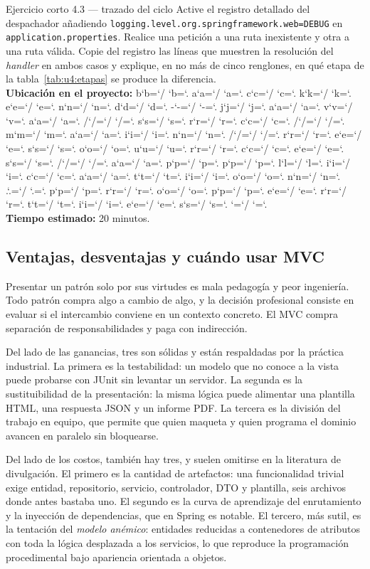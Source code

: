 \documentclass[11pt,a4paper,openany]{book}
\newcommand{\ruta}[1]{{\ttfamily\small\rutaaux #1\relax}}
\def\rutaaux{\futurelet\next\rutapaso}
\def\rutapaso{%
	\ifx\next\relax \let\sig\relax
	\else \let\sig\rutaimprime \fi \sig}
\def\rutaimprime#1{%
	#1\ifnum`#1=`/ \allowbreak\fi
	\ifnum`#1=`. \allowbreak\fi
	\rutaaux}
\begin{document}
\begin{cajaejercicio}{Ejercicio corto 4.3 --- trazado del ciclo}
	Active el registro detallado del despachador añadiendo \texttt{logging.level.org.springframework.web=DEBUG} en \texttt{application.properties}. Realice una petición a una ruta inexistente y otra a una ruta válida. Copie del registro las líneas que muestren la resolución del \emph{handler} en ambos casos y explique, en no más de cinco renglones, en qué etapa de la tabla~\ref{tab:u4:etapas} se produce la diferencia.\\[3pt]
	\textbf{Ubicación en el proyecto:} \ruta{backend-java/src/main/resources/application.properties}\\[3pt]
	\textbf{Tiempo estimado:} 20 minutos.
\end{cajaejercicio}

\subsection{Ventajas, desventajas y cuándo usar MVC}
\label{sec:u4:ventajas}

Presentar un patrón solo por sus virtudes es mala pedagogía y peor ingeniería. Todo patrón compra algo a cambio de algo, y la decisión profesional consiste en evaluar si el intercambio conviene en un contexto concreto. El MVC compra separación de responsabilidades y paga con indirección.

Del lado de las ganancias, tres son sólidas y están respaldadas por la práctica industrial. La primera es la testabilidad: un modelo que no conoce a la vista puede probarse con JUnit sin levantar un servidor. La segunda es la sustituibilidad de la presentación: la misma lógica puede alimentar una plantilla HTML, una respuesta JSON y un informe PDF. La tercera es la división del trabajo en equipo, que permite que quien maqueta y quien programa el dominio avancen en paralelo sin bloquearse.

Del lado de los costos, también hay tres, y suelen omitirse en la literatura de divulgación. El primero es la cantidad de artefactos: una funcionalidad trivial exige entidad, repositorio, servicio, controlador, DTO y plantilla, seis archivos donde antes bastaba uno. El segundo es la curva de aprendizaje del enrutamiento y la inyección de dependencias, que en Spring es notable. El tercero, más sutil, es la tentación del \emph{modelo anémico}: entidades reducidas a contenedores de atributos con toda la lógica desplazada a los servicios, lo que reproduce la programación procedimental bajo apariencia orientada a objetos.
\end{document}
